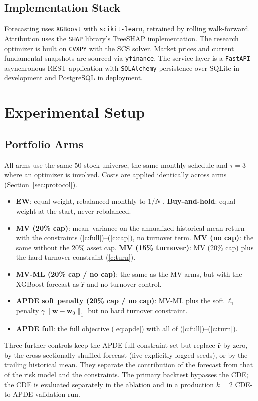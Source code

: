 \documentclass[conference]{IEEEtran}
\begin{document}
\subsection{Implementation Stack}
Forecasting uses \texttt{XGBoost} with \texttt{scikit-learn}, retrained
by rolling walk-forward. Attribution uses the \texttt{SHAP} library's
TreeSHAP implementation. The research optimizer is built on
\texttt{CVXPY} with the SCS solver. Market prices and current
fundamental snapshots are sourced via \texttt{yfinance}. The service
layer is a \texttt{FastAPI} asynchronous REST application with
\texttt{SQLAlchemy} persistence over SQLite in development and
PostgreSQL in deployment.

\section{Experimental Setup}
\label{sec:setup}

\subsection{Portfolio Arms}
All arms use the same 50-stock universe, the same monthly schedule and
$\tau=3$ where an optimizer is involved. Costs are applied identically
across arms (Section~\ref{sec:protocol}).
\begin{itemize}
\item \textbf{EW}: equal weight, rebalanced monthly to $1/N$
\cite{demiguel2009}. \textbf{Buy-and-hold}: equal weight at the start,
never rebalanced.
\item \textbf{MV (20\% cap)}: mean--variance on the annualized
historical mean return with the constraints
(\ref{c:full})--(\ref{c:cap}), no turnover term. \textbf{MV (no cap)}:
the same without the 20\% asset cap. \textbf{MV (15\% turnover)}: MV
(20\% cap) plus the hard turnover constraint (\ref{c:turn}).
\item \textbf{MV-ML (20\% cap / no cap)}: the same as the MV arms, but
with the XGBoost forecast as $\hat{\mathbf{r}}$ and no turnover control.
\item \textbf{APDE soft penalty (20\% cap / no cap)}: MV-ML plus the
soft $\ell_1$ penalty $\gamma\|\mathbf{w}-\mathbf{w}_0\|_1$ but no hard
turnover constraint.
\item \textbf{APDE full}: the full objective (\ref{eq:apde}) with all of
(\ref{c:full})--(\ref{c:turn}).
\end{itemize}
Three further controls keep the APDE full constraint set but replace
$\hat{\mathbf{r}}$ by zero, by the cross-sectionally shuffled forecast
(five explicitly logged seeds), or by the trailing historical mean.
They separate the contribution of the forecast from that of the risk
model and the constraints. The primary backtest bypasses the CDE; the
CDE is evaluated separately in the ablation and in a production $k=2$
CDE-to-APDE validation run.
\end{document}
